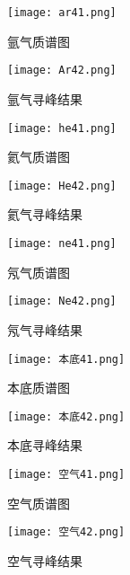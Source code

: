 \documentclass[dvipsnames, svgnames,a4paper,11pt]{article}
\begin{document}
	
\begin{figure}[H]
	\centering
	\begin{minipage}[H]{0.45\textwidth}
		\centering
		\texttt{[image: ar41.png]}
		\caption{氩气质谱图}
	\end{minipage}
	\hfill
	\begin{minipage}[H]{0.45\textwidth}
		\centering
		\texttt{[image: Ar42.png]}
		\caption{氩气寻峰结果}
	\end{minipage}
\end{figure}

\begin{figure}[H]
	\ContinuedFloat
	\begin{minipage}[H]{0.45\textwidth}
		\centering
		\texttt{[image: he41.png]}
		\caption{氦气质谱图}
	\end{minipage}
	\hfill
	\begin{minipage}[H]{0.45\textwidth}
		\centering
		\texttt{[image: He42.png]}
		\caption{氦气寻峰结果}
	\end{minipage}
\end{figure}

\begin{figure}[H]
	\ContinuedFloat
	\begin{minipage}[H]{0.45\textwidth}
		\centering
		\texttt{[image: ne41.png]}
		\caption{氖气质谱图}
	\end{minipage}
	\hfill
	\begin{minipage}[H]{0.45\textwidth}
		\centering
		\texttt{[image: Ne42.png]}
		\caption{氖气寻峰结果}
	\end{minipage}
\end{figure}

\begin{figure}[H]
	\ContinuedFloat
	\begin{minipage}[H]{0.45\textwidth}
		\centering
		\texttt{[image: 本底41.png]}
		\caption{本底质谱图}
	\end{minipage}
	\hfill
	\begin{minipage}[H]{0.45\textwidth}
		\centering
		\texttt{[image: 本底42.png]}
		\caption{本底寻峰结果}
	\end{minipage}
\end{figure}

\begin{figure}[H]
	\ContinuedFloat
	\begin{minipage}[H]{0.45\textwidth}
		\centering
		\texttt{[image: 空气41.png]}
		\caption{空气质谱图}
	\end{minipage}
	\hfill
	\begin{minipage}[H]{0.45\textwidth}
		\centering
		\texttt{[image: 空气42.png]}
		\caption{空气寻峰结果}
	\end{minipage}
\end{figure}
\end{document}
